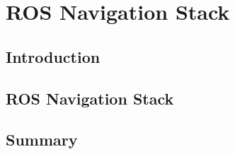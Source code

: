 \chapter{ROS Navigation Stack} \label{ch:BaseWork}

\section{Introduction}



\section{ROS Navigation Stack}\label{ch:requirements}




\section{Summary}



